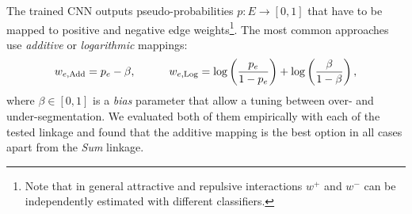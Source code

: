 The trained CNN outputs pseudo-probabilities $p:E \rightarrow [0,1]$ that have to be mapped to positive and negative edge weights\footnote{Note that in general attractive and repulsive interactions $w^+$ and $w^-$ can be independently estimated with different classifiers.}. The most common approaches use \emph{additive} \cite{ailon2008aggregating} or \emph{logarithmic} \cite{finkel2008enforcing,andres2012globally} mappings:
\begin{equation}
w_{e,\mathrm{Add}} = p_e - \beta, \qquad \quad w_{e,\mathrm{Log}} = \log \left( \frac{p_e}{1-p_e} \right) + \log \left( \frac{\beta}{1-\beta} \right),
\end{equation}
where $\beta \in [0,1]$ is a \emph{bias} parameter that allow a tuning between over- and under-segmentation. We evaluated both of them empirically with each of the tested linkage and found that the additive mapping is the best option in all cases apart from the \emph{Sum} linkage. 
